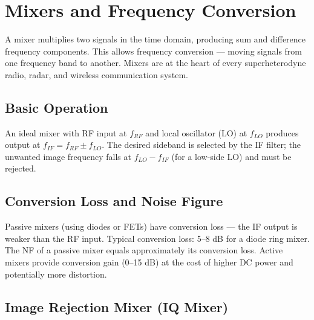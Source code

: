 \section{Mixers and Frequency Conversion}\label{sec:wiki_mixers}



A mixer multiplies two signals in the time domain, producing sum and difference frequency components. This allows frequency conversion — moving signals from one frequency band to another. Mixers are at the heart of every superheterodyne radio, radar, and wireless communication system.

				

\subsection{Basic Operation}

				


				

An ideal mixer with RF input at $f_{RF}$ and local oscillator (LO) at $f_{LO}$ produces output at $f_{IF} = f_{RF} \pm f_{LO}$. The desired sideband is selected by the IF filter; the unwanted image frequency falls at $f_{LO} - f_{IF}$ (for a low-side LO) and must be rejected.


				

\subsection{Conversion Loss and Noise Figure}

				

Passive mixers (using diodes or FETs) have conversion loss — the IF output is weaker than the RF input. Typical conversion loss: 5–8 dB for a diode ring mixer. The NF of a passive mixer equals approximately its conversion loss. Active mixers provide conversion gain (0–15 dB) at the cost of higher DC power and potentially more distortion.

				

\subsection{Image Rejection Mixer (IQ Mixer)}

